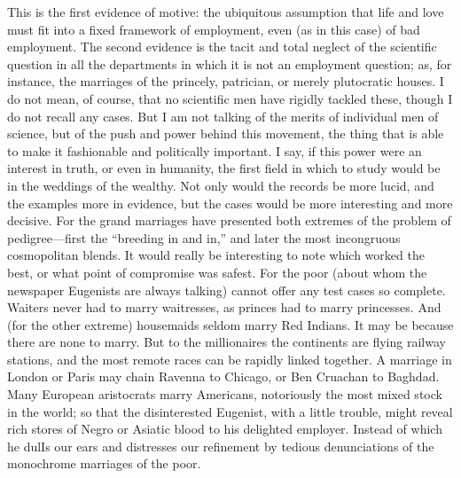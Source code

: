\documentclass{book}
\begin{document}
This is the first evidence of motive: the ubiquitous assumption that life and love must fit into a fixed framework of employment, even (as in this case) of bad employment. The second evidence is the tacit and total neglect of the scientific question in all the departments in which it is not an employment question; as, for instance, the marriages of the princely, patrician, or merely plutocratic houses. I do not mean, of course, that no scientific men have rigidly tackled these, though I do not recall any cases. But I am not talking of the merits of individual men of science, but of the push and power behind this movement, the thing that is able to make it fashionable and politically important. I say, if this power were an interest in truth, or even in humanity, the first field in which to study would be in the weddings of the wealthy. Not only would the records be more lucid, and the examples more in evidence, but the cases would be more interesting and more decisive. For the grand marriages have presented both extremes of the problem of pedigree—first the “breeding in and in,” and later the most incongruous cosmopolitan blends. It would really be interesting to note which worked the best, or what point of compromise was safest. For the poor (about whom the newspaper Eugenists are always talking) cannot offer any test cases so complete. Waiters never had to marry waitresses, as princes had to marry princesses. And (for the other extreme) housemaids seldom marry Red Indians. It may be because there are none to marry. But to the millionaires the continents are flying railway stations, and the most remote races can be rapidly linked together. A marriage in London or Paris may chain Ravenna to Chicago, or Ben Cruachan to Baghdad. Many European aristocrats marry Americans, notoriously the most mixed stock in the world; so that the disinterested Eugenist, with a little trouble, might reveal rich stores of Negro or Asiatic blood to his delighted employer. Instead of which he dulIs our ears and distresses our refinement by tedious denunciations of the monochrome marriages of the poor.
\end{document}
